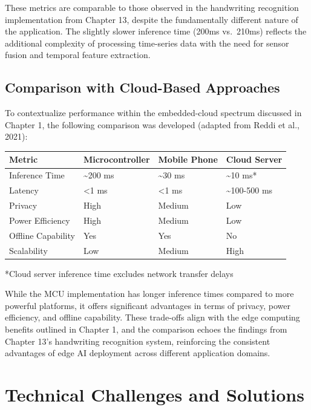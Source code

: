 \documentclass[
  9pt,
  letterpaper,
  abstract,
  titlepage]{scrbook}
\begin{document}
These metrics are comparable to those observed in the handwriting
recognition implementation from Chapter 13, despite the fundamentally
different nature of the application. The slightly slower inference time
(200ms vs.~210ms) reflects the additional complexity of processing
time-series data with the need for sensor fusion and temporal feature
extraction.

\subsection{Comparison with Cloud-Based
Approaches}\label{comparison-with-cloud-based-approaches-1}

To contextualize performance within the embedded-cloud spectrum
discussed in Chapter 1, the following comparison was developed (adapted
from Reddi et al., 2021):

\begin{longtable}[]{@{}llll@{}}
\toprule\noalign{}
Metric & Microcontroller & Mobile Phone & Cloud Server \\
\midrule\noalign{}
\endhead
\bottomrule\noalign{}
\endlastfoot
Inference Time & \textasciitilde200 ms & \textasciitilde30 ms &
\textasciitilde10 ms* \\
Latency & \textless1 ms & \textless1 ms & \textasciitilde100-500 ms \\
Privacy & High & Medium & Low \\
Power Efficiency & High & Medium & Low \\
Offline Capability & Yes & Yes & No \\
Scalability & Low & Medium & High \\
\end{longtable}

*Cloud server inference time excludes network transfer delays

While the MCU implementation has longer inference times compared to more
powerful platforms, it offers significant advantages in terms of
privacy, power efficiency, and offline capability. These trade-offs
align with the edge computing benefits outlined in Chapter 1, and the
comparison echoes the findings from Chapter 13's handwriting recognition
system, reinforcing the consistent advantages of edge AI deployment
across different application domains.

\section{Technical Challenges and
Solutions}\label{technical-challenges-and-solutions}
\end{document}
